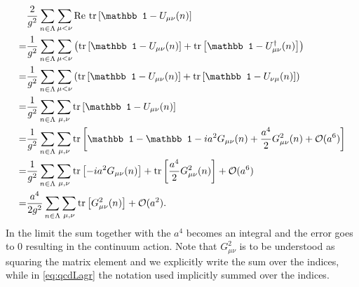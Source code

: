 \begin{align}
    &\frac{2}{g^2}\sum_{n\in\Lambda}\sum_{\mu<\nu}\text{Re tr}\sqbr{\mathbb1-U_{\mu\nu}(n)}\\
    =&\frac{1}{g^2}\sum_{n\in\Lambda}\sum_{\mu<\nu}\rbr{\text{tr}\sqbr{\mathbb1-U_{\mu\nu}(n)}+\text{tr}\sqbr{\mathbb1-U_{\mu\nu}^\dagger(n)}}\\
    =&\frac{1}{g^2}\sum_{n\in\Lambda}\sum_{\mu<\nu}\rbr{\text{tr}\sqbr{\mathbb1-U_{\mu\nu}(n)}+\text{tr}\sqbr{\mathbb1-U_{\nu\mu}(n)}}\\
    =&\frac{1}{g^2}\sum_{n\in\Lambda}\sum_{\mu,\nu}\text{tr}\sqbr{\mathbb1-U_{\mu\nu}(n)}\\
    =&\frac{1}{g^2}\sum_{n\in\Lambda}\sum_{\mu,\nu}\text{tr}\sqbr{\mathbb1-\mathbb 1 -ia^2G_{\mu\nu}(n)+\frac{a^4}{2}G_{\mu\nu}^2(n)+\mathcal{O}(a^6)}\\
    =&\frac{1}{g^2}\sum_{n\in\Lambda}\sum_{\mu,\nu}\text{tr}\sqbr{-ia^2G_{\mu\nu}(n)}+\text{tr}\sqbr{\frac{a^4}{2}G_{\mu\nu}^2(n)}+\mathcal{O}(a^6)\\
    =&\frac{a^4}{2g^2}\sum_{n\in\Lambda}\sum_{\mu,\nu}\text{tr}\sqbr{G_{\mu\nu}^2(n)}+\mathcal{O}(a^2).
\end{align}
In the limit the sum together with the $a^4$ becomes an integral and the error goes to 0 resulting in the continuum action. Note that $G_{\mu\nu}^2$ is to be understood as squaring the matrix element and we explicitly write the sum over the indices, while in \eqref{eq:qcdLagr} the notation used implicitly summed over the indices\cite{gattringer}.

